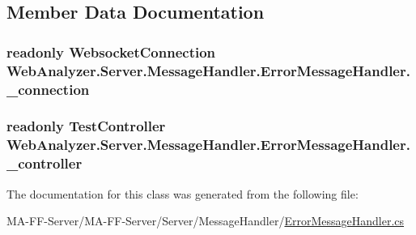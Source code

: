 \subsection{Member Data Documentation}
\hypertarget{class_web_analyzer_1_1_server_1_1_message_handler_1_1_error_message_handler_afcc3d55e1eabc700cafcb9ce2d48106e}{}
\subsubsection[{\+\_\+connection}]{\setlength{\rightskip}{0pt plus 5cm}readonly {\bf Websocket\+Connection} Web\+Analyzer.\+Server.\+Message\+Handler.\+Error\+Message\+Handler.\+\_\+connection\hspace{0.3cm}{\ttfamily [private]}}\label{class_web_analyzer_1_1_server_1_1_message_handler_1_1_error_message_handler_afcc3d55e1eabc700cafcb9ce2d48106e}
\hypertarget{class_web_analyzer_1_1_server_1_1_message_handler_1_1_error_message_handler_acdb5ea45d9c1e9f90af483dd53176fe3}{}
\subsubsection[{\+\_\+controller}]{\setlength{\rightskip}{0pt plus 5cm}readonly {\bf Test\+Controller} Web\+Analyzer.\+Server.\+Message\+Handler.\+Error\+Message\+Handler.\+\_\+controller\hspace{0.3cm}{\ttfamily [private]}}\label{class_web_analyzer_1_1_server_1_1_message_handler_1_1_error_message_handler_acdb5ea45d9c1e9f90af483dd53176fe3}


The documentation for this class was generated from the following file\+:\begin{DoxyCompactItemize}
\item 
M\+A-\/\+F\+F-\/\+Server/\+M\+A-\/\+F\+F-\/\+Server/\+Server/\+Message\+Handler/\hyperlink{_error_message_handler_8cs}{Error\+Message\+Handler.\+cs}\end{DoxyCompactItemize}
